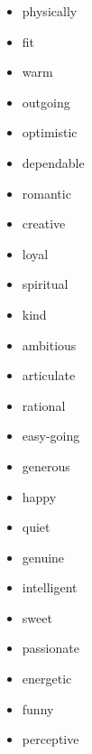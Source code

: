 \begin{appendices}
\begin{itemize}
\begin{enumerate}
\begin{itemize}
				\item physically
				\item fit
				\item warm
				\item outgoing
				\item optimistic
				\item dependable
				\item romantic
				\item creative
				\item loyal
				\item spiritual
				\item kind
				\item ambitious
				\item articulate
				\item rational
				\item easy-going
				\item generous
				\item happy
				\item quiet
				\item genuine
				\item intelligent
				\item sweet
				\item passionate
				\item energetic
				\item funny
				\item perceptive
			\end{itemize}
		\end{enumerate}
	\end{itemize}

\end{appendices}
